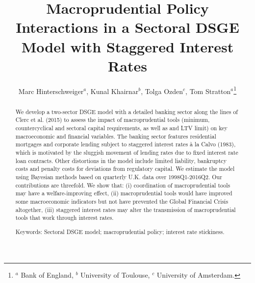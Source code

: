 \documentclass[12pt]{article}
\title{Macroprudential Policy Interactions in a Sectoral DSGE Model with Staggered Interest Rates}
\author{Marc Hinterschweiger$^{a}$, Kunal Khairnar$^{b}$, Tolga Ozden$^{c}$, Tom Stratton$^{a}$\footnote{$^{a}$ Bank of England, $^{b}$ University of Toulouse, $^{c}$ University of Amsterdam.}}
\numberwithin{equation}{section}
\begin{document}
\maketitle



\begin{abstract}

We develop a two-sector DSGE model with a detailed banking sector along the lines of Clerc et al. (2015) to assess the impact of macroprudential tools (minimum, countercyclical and sectoral capital requirements, as well as and LTV limit) on key macroeconomic and financial variables. The banking sector features residential mortgages and corporate lending subject to staggered interest rates à la Calvo (1983), which is motivated by the sluggish movement of lending rates due to fixed interest rate loan contracts. Other distortions in the model include limited liability, bankruptcy costs and penalty costs for deviations from regulatory capital. We estimate the model using Bayesian methods based on quarterly U.K. data over 1998Q1-2016Q2. Our contributions are threefold. We show that: (i) coordination of macroprudential tools may have a welfare-improving effect, (ii) macroprudential tools would have improved some macroeconomic indicators but not have prevented the Global Financial Crisis altogether, (iii) staggered interest rates may alter the transmission of macroprudential tools that work through interest rates. 

\noindent

\vspace{3 mm}
Keywords: Sectoral DSGE model; macroprudential policy; interest rate stickiness. \\
\noindent 


	
\end{abstract}
\noindent\vspace{3 mm}
\end{document}
